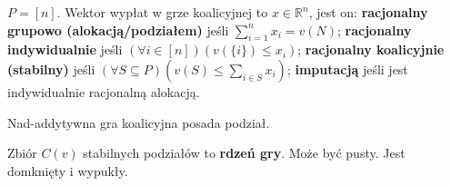\begin{definicja}
    $P=[n]$. Wektor wypłat w grze koalicyjnej to $x\in\mathbb{R}^n$, jest on:
    \textbf{racjonalny grupowo (alokacją/podziałem)} jeśli $\sum_{i=1}^n{x_i=v(N)}$;
    \textbf{racjonalny indywidualnie} jeśli $(\forall i\in [n]) (v(\{i\}) \leq x_i)$;
    \textbf{racjonalny koalicyjnie (stabilny)} jeśli $(\forall S\subseteq P)(v(S)\leq\sum_{i\in S}{x_i})$;
    \textbf{imputacją} jeśli jest indywidualnie racjonalną alokacją.
\end{definicja}
\begin{fakt}
    Nad-addytywna gra koalicyjna posada podział.
\end{fakt}
\begin{definicja}
    Zbiór $C(v)$ stabilnych podziałów to \textbf{rdzeń gry}. Może być pusty. Jest domknięty i wypukły.
\end{definicja}


